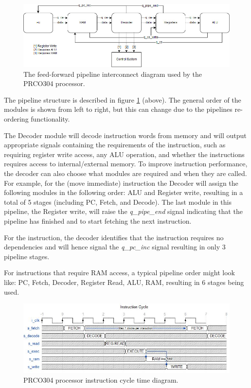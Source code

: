 \documentclass[11pt,a4paper]{report}
\newcommand{\scname}{PRCO304}
\begin{document}
\begin{figure}[ht]
\centering
     \includegraphics[width=1.0\textwidth]{prco_forward_pipe}
      \caption{The feed-forward pipeline interconnect diagram used by the \scname{} processor.}
       \label{fig:prco_forward_pipe}
\end{figure}

The pipeline structure is described in figure \ref{fig:prco_forward_pipe} (above). The general order of the modules is shown from left to right, but this can change due to the pipelines re-ordering functionality.

The Decoder module will decode instruction words from memory and will output appropriate signals containing the requirements of the instruction, such as requiring register write access, any ALU operation, and whether the instructions requires access to internal/external memory.
\newline\newline
To improve instruction performance, the decoder can also choose what modules are required and when they are called. For example, for the {} (move immediate) instruction the Decoder will assign the following modules in the following order: ALU and Register write, resulting in a total of 5 stages (including PC, Fetch, and Decode). The last module in this pipeline, the Register write, will raise the \textit{q\_pipe\_end} signal indicating that the pipeline has finished and to start fetching the next instruction.

For the {} instruction, the decoder identifies that the instruction requires no dependencies and will hence signal the \textit{q\_pc\_inc} signal resulting in only 3 pipeline stages.

For instructions that require RAM access, a typical pipeline order might look like: PC, Fetch, Decoder, Register Read, ALU, RAM, resulting in 6 stages being used.

\begin{figure}[H]
\begin{center}
\includegraphics[scale=0.8]{td_instr}
\end{center}
\caption{\scname{} processor instruction cycle time diagram.}
\label{fig:dft_algorithm}
\end{figure}
\end{document}
